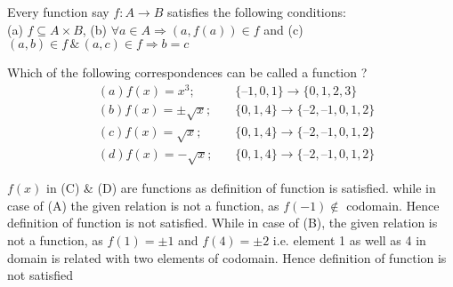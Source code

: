 \documentclass[letterpaper,11pt]{scrartcl}
\begin{document}
Every function say $f : A \rightarrow B$ satisfies the following conditions:\\
(a) $f \subseteq A\times B$, (b) $\forall a\in A \Rightarrow (a, f(a)) \in f$ and (c) $(a, b)\in f\, \&\, (a, c) \in f \Rightarrow b = c$
\begin{example}
Which of the following correspondences can be called a function ?
\begin{align*}
&(a) f(x) = x^3 ;&\, &\{–1, 0, 1\} \rightarrow \{0, 1, 2, 3\}\\
&(b) f(x) = \pm \sqrt{x} ;&\, &\{0, 1, 4\} \rightarrow \{–2, –1, 0, 1, 2\}\\
&(c) f(x) = \sqrt{x} ;&\, &\{0, 1, 4\} \rightarrow \{–2, –1, 0, 1, 2\}\\
&(d) f(x) = -\sqrt{x} ;&\, &\{0, 1, 4\} \rightarrow \{–2, –1, 0, 1, 2\}
\end{align*}
\end{example}

\begin{soln}
$f(x)$ in (C) \& (D) are functions as definition of function is satisfied. while in case of (A) the given relation is not a function, as $f(-1) \not\in $ codomain. Hence definition of function is not satisfied. While in case of (B), the given relation is not a function, as $f(1) = \pm 1$ and $f(4) = \pm 2$ i.e. element 1 as well as 4 in domain is related with two elements of codomain. Hence definition of function is not satisfied
\end{soln}
\end{document}
